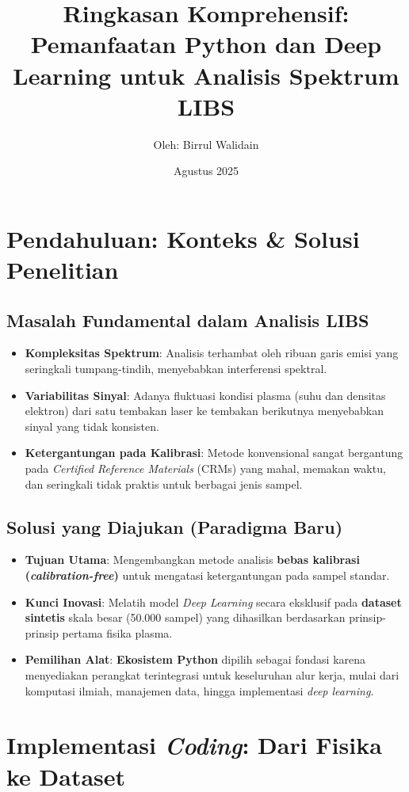 \documentclass[12pt, a4paper]{article}
\title{\vspace{-2cm}\huge\bfseries Ringkasan Komprehensif: \\ Pemanfaatan Python dan Deep Learning untuk Analisis Spektrum LIBS}
\author{\large Oleh: Birrul Walidain}
\date{\normalsize Agustus 2025}
\newcommand{\subsectiontitle}[1]{\subsection*{\large\bfseries #1}}
\begin{document}
\maketitle
\thispagestyle{empty} %
\newpage

\tableofcontents
\newpage

\section{Pendahuluan: Konteks \& Solusi Penelitian}

\subsectiontitle{Masalah Fundamental dalam Analisis LIBS}
\begin{itemize}
    \item \textbf{Kompleksitas Spektrum}: Analisis terhambat oleh ribuan garis emisi yang seringkali tumpang-tindih, menyebabkan interferensi spektral.
    \item \textbf{Variabilitas Sinyal}: Adanya fluktuasi kondisi plasma (suhu dan densitas elektron) dari satu tembakan laser ke tembakan berikutnya menyebabkan sinyal yang tidak konsisten.
    \item \textbf{Ketergantungan pada Kalibrasi}: Metode konvensional sangat bergantung pada \textit{Certified Reference Materials} (CRMs) yang mahal, memakan waktu, dan seringkali tidak praktis untuk berbagai jenis sampel.
\end{itemize}

\subsectiontitle{Solusi yang Diajukan (Paradigma Baru)}
\begin{itemize}
    \item \textbf{Tujuan Utama}: Mengembangkan metode analisis \textbf{bebas kalibrasi (\textit{calibration-free})} untuk mengatasi ketergantungan pada sampel standar.
    \item \textbf{Kunci Inovasi}: Melatih model \textit{Deep Learning} secara eksklusif pada \textbf{dataset sintetis} skala besar (50.000 sampel) yang dihasilkan berdasarkan prinsip-prinsip pertama fisika plasma.
    \item \textbf{Pemilihan Alat}: \textbf{Ekosistem Python} dipilih sebagai fondasi karena menyediakan perangkat terintegrasi untuk keseluruhan alur kerja, mulai dari komputasi ilmiah, manajemen data, hingga implementasi \textit{deep learning}.
\end{itemize}

\section{Implementasi \textit{Coding}: Dari Fisika ke Dataset}
\end{document}
